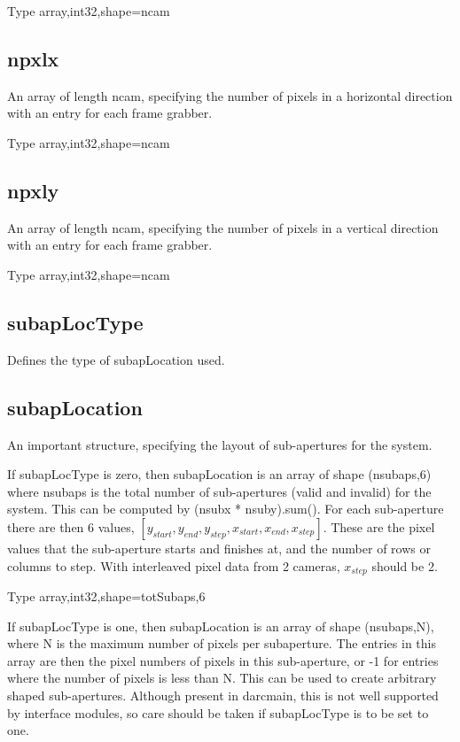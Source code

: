 \documentclass[a4,10pt]{article}
\begin{document}
Type array,int32,shape=ncam

\subsection{npxlx}
An array of length ncam, specifying the number of pixels in a
horizontal direction with an entry for each frame grabber.

Type array,int32,shape=ncam

\subsection{npxly}
An array of length ncam, specifying the number of pixels in a
vertical direction with an entry for each frame grabber.

Type array,int32,shape=ncam



\subsection{subapLocType}
Defines the type of subapLocation used.


\subsection{subapLocation}

An important structure, specifying the layout of sub-apertures for the
system.  

If subapLocType is zero, then subapLocation is an array of shape (nsubaps,6) where nsubaps is the
total number of sub-apertures (valid and invalid) for the system.
This can be computed by (nsubx * nsuby).sum().  For each sub-aperture
there are then 6 values,
$[y_{start},y_{end},y_{step},x_{start},x_{end},x_{step}]$.  These are
the pixel values that the sub-aperture starts and finishes at, and the
number of rows or columns to step.  With interleaved pixel data from 2
cameras, $x_{step}$ should be 2.  

Type array,int32,shape=totSubaps,6

If subapLocType is one, then subapLocation is an array of shape
(nsubaps,N), where N is the maximum number of pixels per subaperture.
The entries in this array are then the pixel numbers of pixels in this
sub-aperture, or -1 for entries where the number of pixels is less
than N.  This can be used to create arbitrary shaped sub-apertures.
Although present in darcmain, this is not well supported by interface
modules, so care should be taken if subapLocType is to be set to one.
\end{document}
